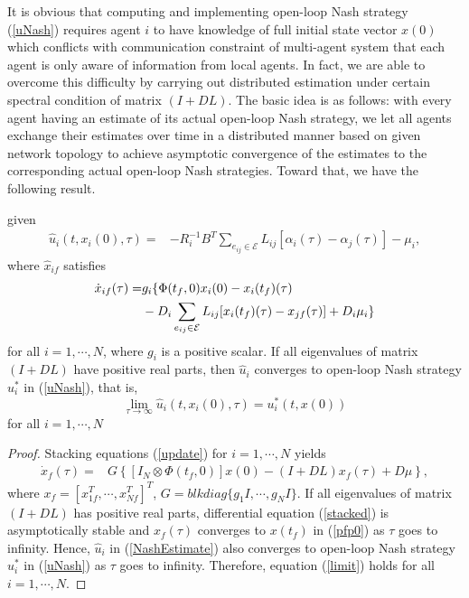 \documentclass[10pt,doublecolumn]{IEEEtran}  %
\begin{document}
It is obvious that computing and implementing open-loop Nash strategy (\ref{uNash}) requires agent $i$ to have knowledge of full initial state vector $x(0)$ which conflicts with communication constraint of multi-agent system that each agent is only aware of information from local agents. In fact, we are able to overcome this difficulty by carrying out distributed estimation under certain spectral condition of matrix $(I+DL)$. The basic idea is as follows: with every agent having an estimate of its actual open-loop Nash strategy, we let all agents exchange their estimates over time in a distributed manner based on given network topology to achieve asymptotic convergence of the estimates to the corresponding actual open-loop Nash strategies. Toward that, we have the following result.
\begin{thm}\label{Thm1}
given
\begin{align}
\hat{u}_i(t,x_i(0),\tau) =&-R_i^{-1}B^T\sum_{e_{ij}\in\mathcal{E}}L_{ij}[\alpha_i(\tau)-\alpha_j(\tau)]-\mu_i,\label{NashEstimate}
\end{align}
where $\hat{x}_{if}$ satisfies
\begin{align}
\dot{x}_{if}(\tau)=&g_i\{\Phi(t_f,0)x_i(0)-x_i(t_f)(\tau)\notag\\
&-D_i\sum_{e_{ij}\in\mathcal{E}}L_{ij}[x_i(t_f)(\tau)-x_{jf}(\tau)]+D_i\mu_i\}\label{update}
\end{align}
for all $i=1,\cdots,N$, where $g_i$ is a positive scalar. If all eigenvalues of matrix $(I+DL)$ have positive real parts, then $\hat{u}_i$ converges to open-loop Nash strategy $u^*_i$ in (\ref{uNash}), that is,
\begin{equation}
\lim_{\tau\rightarrow\infty}\hat{u}_i(t, x_i(0), \tau) = u^*_i(t,x(0))\label{limit}
\end{equation}
for all $i=1,\cdots,N$ 
\end{thm}
\begin{proof}
Stacking equations (\ref{update}) for $i=1,\cdots,N$ yields
\begin{align}
\dot{x}_{f}(\tau)=&G\left\{[I_N\otimes\Phi(t_f,0)]x(0)-(I+DL)x_f(\tau)+D\mu\right\},\label{stacked}
\end{align}
where $x_f=[x_{1f}^T,\cdots,x_{Nf}^T]^T$, $G=blkdiag\{g_1I,\cdots,g_NI\}$. If all eigenvalues of matrix $(I+DL)$ has positive real parts, differential equation (\ref{stacked}) is asymptotically stable and $x_{f}(\tau)$ converges to $x(t_f)$ in (\ref{pfp0}) as $\tau$ goes to infinity. Hence, $\hat{u}_i$ in (\ref{NashEstimate}) also converges to open-loop Nash strategy $u_i^*$ in (\ref{uNash}) as $\tau$ goes to infinity. Therefore, equation (\ref{limit}) holds for all $i=1,\cdots,N$.
\end{proof}
\end{document}
